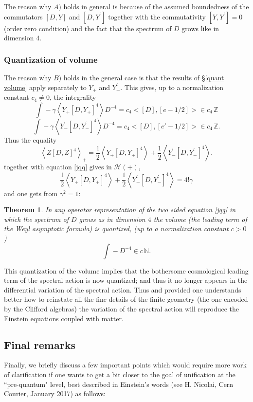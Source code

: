 \documentclass[12pt]{article}
\newtheorem{thm}{Theorem}[section]
\def\Z{{\mathbb Z}}
\def\cH{{\mathcal H}}
\begin{document}
The reason why $A)$ holds in general is because of the assumed boundedness of
the commutators $[D,Y]$ and $[D,Y^{\prime}]$ together with the commutativity
$[Y,Y^{\prime}]=0$ (order zero condition) and the fact that the spectrum of
$D$ grows like in dimension $4$.

\subsubsection{Quantization of volume}
The reason why $B)$ holds in the general case is that the results of \S \ref{quant volume} apply separately to $Y_{+}$ and $Y_{-}^{\prime}$. This gives, up to a normalization constant $c_4\neq 0$, the integrality
\[
{\int\!\!\!\!\!\! -} \gamma\left\langle Y_{+}\left[  D,Y_{+}\right]
^{4}\right\rangle D^{-4}=c_4 <[D],[e-1/2]>\in c_4\,\Z
\]
\[
{\int\!\!\!\!\!\! -} \gamma\left\langle Y_{-}^{\prime
}\left[  D,Y_{-}^{\prime
}\right]
^{4}\right\rangle D^{-4}=c_4 <[D],[e'-1/2]>\in c_4\, \Z.
\]
Thus the equality
\[
\left\langle Z\left[  D,Z\right]  ^{4} \right\rangle_{+} =\frac{1}{2}\left\langle
Y_{+}\left[  D,Y_{+}\right]  ^{4} \right\rangle +\frac{1}{2}\left\langle Y_{-}^{\prime
}\left[  D,Y_{-}^{\prime}\right]  ^{4} \right\rangle .
\]
together with equation \eqref{jqq} gives in $\cH(+)$,
$$
\frac{1}{2}\left\langle
Y_{+}\left[  D,Y_{+}\right]  ^{4} \right\rangle +\frac{1}{2}\left\langle Y_{-}^{\prime
}\left[  D,Y_{-}^{\prime}\right]  ^{4} \right\rangle=4!\gamma
$$
and one gets from $\gamma^2=1$:
\begin{thm} In any operator representation of the two sided equation \eqref{jqq} in
which the spectrum of $D$ grows as in dimension $4$ the volume (the leading
term of the Weyl asymptotic formula) is quantized, 
 (up to a normalization constant $c>0$)
\[
{\int\!\!\!\!\!\! -} D^{-4}\in c\, \mathbb{N }.
\]	
\end{thm}
This quantization of the volume implies that the bothersome cosmological leading term of the spectral action is now quantized; and thus it no longer appears in the differential variation of the spectral action.  Thus and provided one understands better how to reinstate all the fine details of the finite geometry (the one encoded by the Clifford algebras)  the variation of the spectral action will reproduce the Einstein equations
coupled with matter.
\subsection{Final remarks} Finally, we briefly discuss a few important points which would require more work of clarification if one wants to get a bit closer to the goal of unification at the ``pre-quantum" level,  best described in Einstein's words (see H. Nicolai, Cern Courier, January 2017) as follows:
\end{document}
